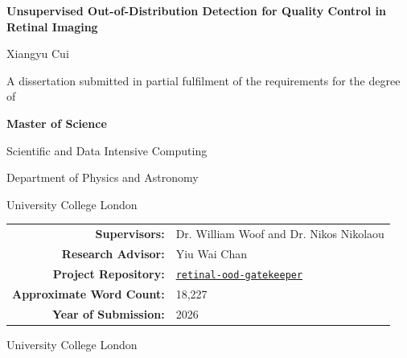 \documentclass[fleqn,12pt]{olplainarticle}
\newcommand{\thesistitle}{%
Unsupervised Out-of-Distribution Detection for Quality Control in Retinal Imaging%
}
\newcommand{\projectrepository}{%
https://github.com/Xiangyu2141480/retinal-ood-gatekeeper%
}
\newcommand{\thesiswordcount}{18,227}
\begin{document}
\raggedbottom

\begin{titlepage}
    \thispagestyle{empty}
    \centering

    \vspace*{1.25cm}

    {\Large\bfseries \thesistitle\par}

    \vspace{1.8cm}

    {\large Xiangyu Cui\par}

    \vspace{1.25cm}

    {\normalsize
    A dissertation submitted in partial fulfilment of the requirements for the degree of\par}

    \vspace{0.45cm}

    {\large\bfseries Master of Science\par}
    {\large Scientific and Data Intensive Computing\par}

    \vspace{1.3cm}

    {\normalsize
    Department of Physics and Astronomy\par
    University College London\par}

    \vfill

    \begin{tabular}{@{}rl@{}}
        \textbf{Supervisors:} &
        Dr. William Woof and Dr. Nikos Nikolaou \\[0.35em]
        \textbf{Research Advisor:} &
        Yiu Wai Chan \\[0.35em]
        \textbf{Project Repository:} &
        \href{\projectrepository}{\texttt{retinal-ood-gatekeeper}} \\[0.35em]
        \textbf{Approximate Word Count:} &
        \thesiswordcount \\[0.35em]
        \textbf{Year of Submission:} &
        2026
    \end{tabular}

    \vfill

    {\normalsize University College London\par}
\end{titlepage}
\end{document}
